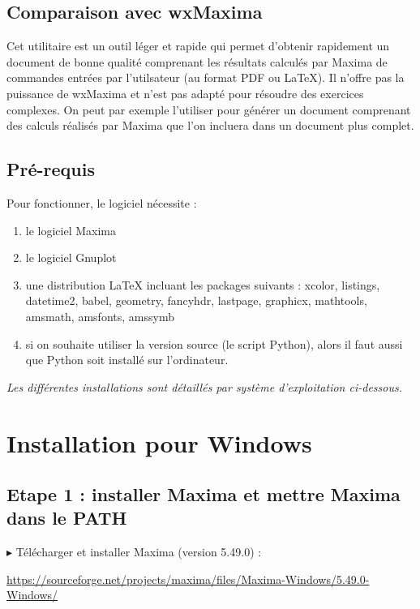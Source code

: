 \documentclass[a4paper, 11pt]{article}
\newcounter{num}
\begin{document}
\subsection*{Comparaison avec wxMaxima}

Cet utilitaire est un outil léger et rapide qui permet d'obtenir rapidement un document de bonne qualité comprenant les résultats calculés par Maxima de commandes entrées par l'utilsateur (au format PDF ou \LaTeX{}). Il n'offre pas la puissance de wxMaxima et n'est pas adapté pour résoudre des exercices complexes. On peut par exemple l'utiliser pour générer un document comprenant des calculs réalisés par Maxima que l'on incluera dans un document plus complet.

\subsection*{Pré-requis}

Pour fonctionner, le logiciel nécessite :
\begin{enumerate}
\item le logiciel Maxima
\item le logiciel Gnuplot 
\item une distribution \LaTeX{} incluant les packages suivants : xcolor, listings, datetime2, babel, geometry, fancyhdr, lastpage, graphicx, mathtools, amsmath, amsfonts, amssymb
\item si on souhaite utiliser la version source (le script Python), alors il faut aussi que Python soit installé sur l'ordinateur.
\end{enumerate} 

\emph{Les différentes installations sont détaillés par système d'exploitation ci-dessous.}

\section*{Installation pour Windows}

\subsection*{Etape 1 : installer Maxima et mettre Maxima dans le PATH}
$\blacktriangleright$ Télécharger et installer Maxima (version 5.49.0) :
\begin{center}
\href{https://sourceforge.net/projects/maxima/files/Maxima-Windows/5.49.0-Windows/}
{https://sourceforge.net/projects/maxima/files/Maxima-Windows/5.49.0-Windows/}
\end{center}
\end{document}
